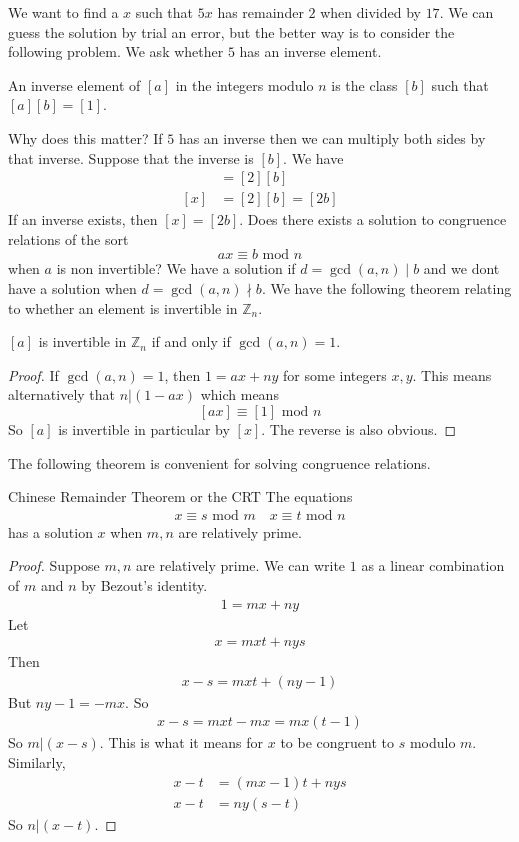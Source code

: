 \documentclass{article}
\begin{document}
We want to find a $x$ such that $5x$ has remainder $2$ when divided by $17$. We can guess the solution by trial an error, but the better way is to 
consider the following problem. We ask whether $5$ has an inverse element.
\begin{definition}
    An inverse element of $[a]$ in the integers modulo $n$ is the class $[b]$ such
    that $[a][b]=[1]$.
\end{definition}
Why does this matter? If $5$ has an inverse then we can multiply both sides by that inverse. Suppose that the inverse 
is $[b]$. We have
\begin{align*}
    [5][b][x]&=[2][b] \\
    [x]&=[2][b]=[2b]
\end{align*}
If an inverse exists, then $[x]=[2b]$. Does there exists a solution to congruence relations of the sort 
\[ax\equiv b \text{ mod } n\]
when $a$ is non invertible? We have a solution if $d=\gcd(a,n)\mid b$ and we dont have a solution when $d=\gcd(a,n)\nmid b$.
We have the following theorem relating to whether an element is invertible in $\mathbb{Z}_n$.
\begin{theorem}
    $[a]$ is invertible in $\mathbb{Z}_n$ if and only if $\gcd(a,n)=1$.
\end{theorem}
\begin{proof}
    If $\gcd(a,n)=1$, then $1=ax+ny$ for some integers $x,y$. This means alternatively that $n|(1-ax)$ which means
    \[[ax]\equiv [1] \text{ mod } n\]
    So $[a]$ is invertible in particular by $[x]$. The reverse is also obvious.
\end{proof}
The following theorem is convenient for solving congruence relations.
\begin{theorem}{Chinese Remainder Theorem or the CRT}
    The equations
    \begin{align*}
        x \equiv s \text{ mod } m \quad x \equiv t \text{ mod } n
    \end{align*}
    has a solution $x$ when $m,n$ are relatively prime.
\end{theorem}
\begin{proof}
    Suppose $m,n$ are relatively prime. We can write $1$ as a linear combination of
    $m$ and $n$ by Bezout's identity.
    \begin{align*}
        1=mx+ny
    \end{align*}
    Let \begin{align*}
        x=mxt+nys
    \end{align*}
    Then
    \begin{align*}
        x-s = mxt+(ny-1)
    \end{align*}
    But $ny-1 =-mx$. So 
    \begin{align*}
        x-s = mxt-mx =mx(t-1)
    \end{align*}
    So $m|(x-s)$. This is what it means for $x$ to be congruent to $s$ modulo $m$.
    Similarly, 
    \begin{align*}
        x-t&=(mx-1)t+nys \\
        x-t &= ny(s-t)
    \end{align*}
    So $n|(x-t)$.

    
\end{proof}
\end{document}
